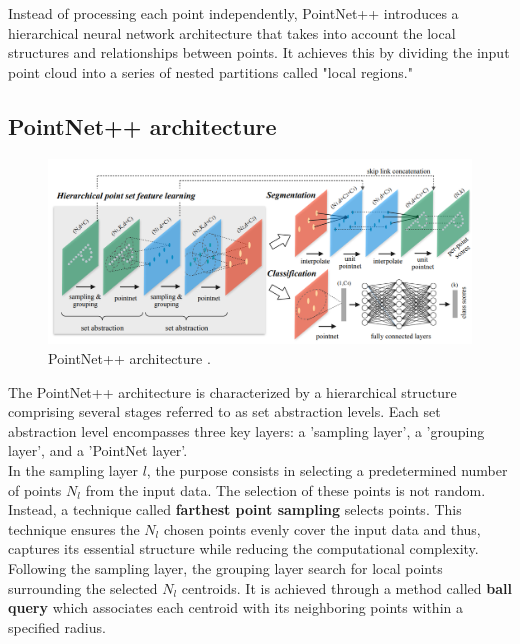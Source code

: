 Instead of processing each point independently, PointNet++ introduces a hierarchical neural network architecture that takes into account the local structures and relationships between points. It achieves this by dividing the input point cloud into a series of nested partitions called "local regions."

\subsection{PointNet++ architecture}
\begin{figure}[ht]
    \centering
    \includegraphics[width=\textwidth]{Img/05_Pointnet2.png}
    \caption{PointNet++ architecture \cite{PointNet2}.}
    \label{fig:Pointnet2}
\end{figure}

The PointNet++ architecture is characterized by a hierarchical structure comprising several stages referred to as set abstraction levels. Each set abstraction level encompasses three key layers: a 'sampling layer', a 'grouping layer', and a 'PointNet layer'.\\

In the sampling layer $l$, the purpose consists in selecting a predetermined number of points $N_l$ from the input data. The selection of these points is not random. Instead, a technique called \textbf{farthest point sampling} selects points. This technique ensures the $N_l$ chosen points evenly cover the input data and thus, captures its essential structure while reducing the computational complexity.\\

Following the sampling layer, the grouping layer search for local points surrounding the selected $N_l$ centroids. It is achieved through a method called \textbf{ball query} which associates each centroid with its neighboring points within a specified radius.\\

